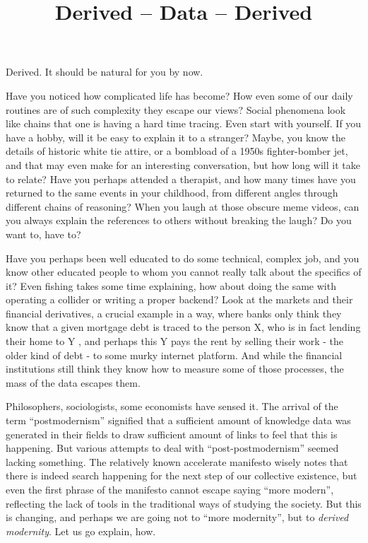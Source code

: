 \documentclass{article}
\title{Derived -- Data -- Derived}
\author{}
\begin{document}
\thispagestyle{empty}

\maketitle

\noindent Derived. It should be natural for you by now.




Have you noticed how complicated life has become? How even some of our daily routines are of such complexity they escape our views? Social phenomena look like chains that one is having a hard time tracing. Even start with yourself. If you have a hobby, will it be easy to explain it to a stranger? Maybe, you know the details of historic white tie attire, or a bombload of a 1950s fighter-bomber jet, and that may even make for an interesting conversation, but how long will it take to relate? Have you perhaps attended a therapist, and how many times have you returned to the same events in your childhood, from different angles through different chains of reasoning?
When you laugh at those obscure meme videos, can you always explain the references to others without breaking the laugh? Do you want to, have to?


Have you perhaps been well educated to do some technical, complex job, and you know other educated people to whom you cannot really talk about the specifics of it? Even fishing takes some time explaining, how about doing the same with operating a collider or writing a proper backend? Look at the markets and their financial derivatives, a crucial example in a way, where banks only think they know that a given mortgage debt is traced to the person X, who is in fact lending their home to Y \cite{BGSHT}, and perhaps this Y pays the rent by selling their work - the older kind of debt - to some murky internet platform. And while the financial institutions still think they know how to measure some of those processes, the mass of the data escapes them.

Philosophers, sociologists, some economists have sensed it. The arrival of the term “postmodernism” signified that a sufficient amount of knowledge data was generated in their fields to draw sufficient amount of links to feel that this is happening. But various attempts to deal with “post-postmodernism” seemed lacking something. The relatively known accelerate manifesto \cite{SRNICEK} wisely notes that there is indeed search happening for the next step of our collective existence, but even the first phrase of the manifesto cannot escape saying “more modern”, reflecting the lack of tools in the traditional ways of studying the society. But this is changing, and perhaps we are going not to ``more modernity'', but to \emph{derived modernity}. Let us go explain, how.
\end{document}
